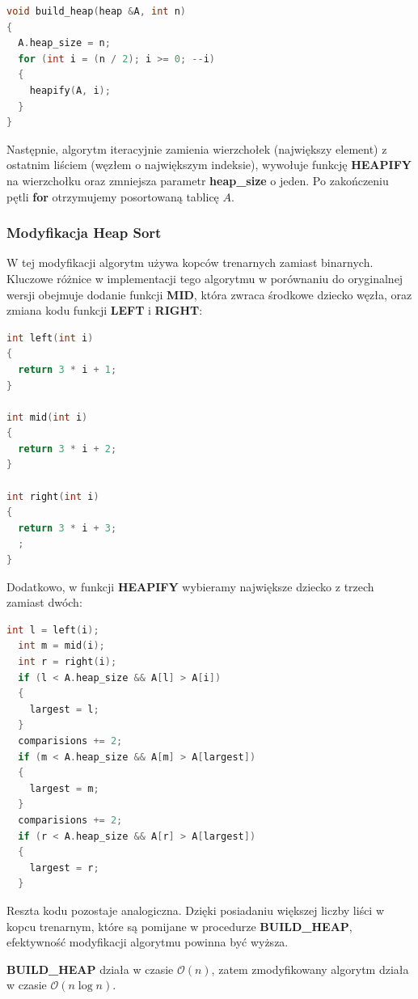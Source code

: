 \documentclass{article}
\newcommand{\bigO}{\mathcal{O}}
\begin{document}
\begin{lstlisting}[style=mystyle, language=C++, caption={Implementacja \texttt{Build Heap}}, label={lst:buildheap}]
void build_heap(heap &A, int n)
{
  A.heap_size = n;
  for (int i = (n / 2); i >= 0; --i)
  {
    heapify(A, i);
  }
}
\end{lstlisting}

Następnie, algorytm iteracyjnie zamienia wierzchołek (największy element) z ostatnim liściem (węzłem o największym indeksie), wywołuje funkcję \textbf{HEAPIFY} na wierzchołku oraz zmniejsza parametr \textbf{heap\_size} o jeden. Po zakończeniu pętli \textbf{for} otrzymujemy posortowaną tablicę $A$.
\subsubsection{Modyfikacja Heap Sort}
W tej modyfikacji algorytm używa kopców trenarnych zamiast binarnych. Kluczowe różnice w implementacji tego algorytmu w porównaniu do oryginalnej wersji obejmuje dodanie funkcji \textbf{MID}, która zwraca środkowe dziecko węzła, oraz zmiana kodu funkcji \textbf{LEFT} i \textbf{RIGHT}:
\begin{lstlisting}[style=mystyle, language=C++, caption={Implementacja \texttt{Left}, \texttt{Mid} i \texttt{Right}}, label={lst:lmr}]
int left(int i)
{
  return 3 * i + 1;
}

int mid(int i)
{
  return 3 * i + 2;
}

int right(int i)
{
  return 3 * i + 3;
  ;
}
\end{lstlisting}
Dodatkowo, w funkcji \textbf{HEAPIFY} wybieramy największe dziecko z trzech zamiast dwóch:
\begin{lstlisting}[style=mystyle, language=C++, caption={Część implementacji zmodyfikowanego \texttt{Heapify}}, label={lst:buildheap2}]
  int l = left(i);
  int m = mid(i);
  int r = right(i);
  if (l < A.heap_size && A[l] > A[i])
  {
    largest = l;
  }
  comparisions += 2;
  if (m < A.heap_size && A[m] > A[largest])
  {
    largest = m;
  }
  comparisions += 2;
  if (r < A.heap_size && A[r] > A[largest])
  {
    largest = r;
  }
\end{lstlisting}
Reszta kodu pozostaje analogiczna. Dzięki posiadaniu większej liczby liści w kopcu trenarnym, które są pomijane w procedurze \textbf{BUILD\_HEAP}, efektywność modyfikacji algorytmu powinna być wyższa.

\textbf{BUILD\_HEAP} działa w czasie $\bigO(n)$, zatem zmodyfikowany algorytm działa w czasie $\bigO (n \log n)$.
\end{document}

